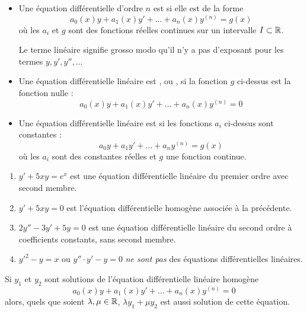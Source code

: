 \documentclass[class=report,crop=false]{standalone}
\begin{document}
\begin{itemize}
  \item Une équation différentielle d'ordre $n$ est  si elle est de la forme
$$a_0(x)y+a_1(x)y'+\dots +a_n(x)y^{(n)} = g(x)$$
où les $a_i$ et $g$ sont des fonctions réelles continues sur un intervalle $I\subset \mathbb{R}$.

Le terme linéaire signifie grosso modo qu'il n'y a pas d'exposant pour les termes $y,y',y'',\ldots$

  \item Une équation différentielle linéaire est 
  , ou 
  ,
  si la fonction $g$ ci-dessus est la fonction nulle :
  $$a_0(x)y+a_1(x)y'+\dots +a_n(x)y^{(n)} = 0$$

  \item Une équation différentielle linéaire est  si
  les fonctions $a_i$ ci-dessus sont constantes :
  $$a_0y+a_1y'+\dots +a_ny^{(n)} = g(x)$$
  où les $a_i$ sont des constantes réelles et $g$ une fonction continue.
\end{itemize}

\begin{exemple}
\sauteligne
\begin{enumerate}
  \item $y' + 5xy = e^x$ est une équation différentielle linéaire du premier ordre avec second membre.

  \item $y' + 5xy = 0$ est l'équation différentielle homogène associée à la précédente.

  \item $2y'' - 3y' + 5y = 0$ est une équation différentielle linéaire du second ordre à coefficients constants,
  sans second membre.


  \item $y'^2 - y = x$ ou $y'' \cdot  y' - y = 0$ \emph{ne sont pas} des équations différentielles linéaires.
\end{enumerate}
\end{exemple}



\begin{proposition}
Si $y_1$ et $y_2$ sont solutions de l'équation différentielle linéaire homogène
\begin{equation}
  a_0(x)y+a_1(x)y'+\dots +a_n(x)y^{(n)} = 0
  \label{eq:eqdifflin}
 \tag{$E_0$}
\end{equation}
alors, quels que soient $\lambda,\mu \in \mathbb{R}$, $\lambda y_1 + \mu y_2$ est aussi solution de cette équation.
\end{proposition}
\end{document}
